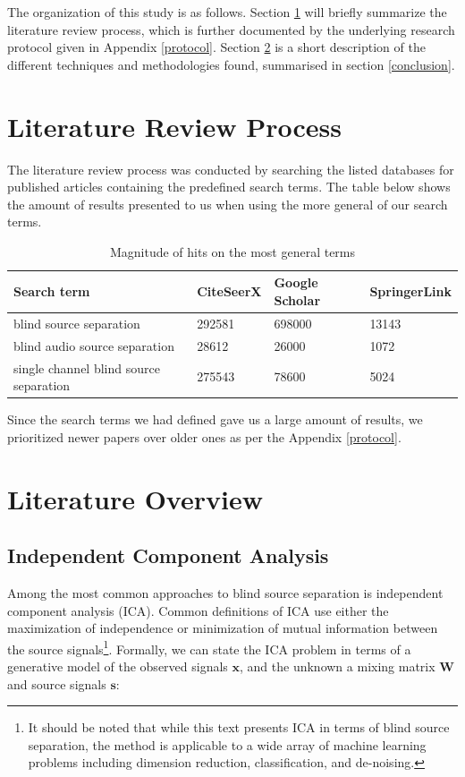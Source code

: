 The organization of this study is as follows. Section
\ref{reviewProcess} will briefly summarize the literature review
process, which is further documented by the underlying research
protocol given in Appendix \ref{protocol}. Section \ref{overview} is
a short description of the different techniques and methodologies found, summarised in section \ref{conclusion}.

\section{Literature Review Process}\label{reviewProcess} %
The literature review process was conducted by searching the listed databases for published articles containing the predefined search terms.
The table below shows the amount of results presented to us when  using the more general of our search terms.

\begin{table}[h]
\centering
	\begin{tabular}{|l|l|l|l|}
	\hline
	\textbf{Search term} & \textbf{CiteSeerX} & \textbf{Google Scholar} & \textbf{SpringerLink} \\
	\hline
	blind source separation & 292581 & 698000 & 13143\\
	blind audio source separation & 28612 & 26000 & 1072\\
	single channel blind source separation & 275543 & 78600 & 5024\\
	\hline
	\end{tabular}
\caption{Magnitude of hits on the most general terms}
\label{tab:myfirsttable}
\end{table}

Since the search terms we had defined gave us a large amount of results, we prioritized newer papers over older ones as per the Appendix \ref{protocol}. 

\section{Literature Overview}\label{overview}



\subsection{Independent Component Analysis} %

Among the most common approaches to blind source separation is
independent component analysis (ICA). Common definitions of ICA use
either the maximization of independence or minimization of mutual information between the source
signals\footnote{It should be noted that while this text presents ICA
  in terms of blind source separation, the method is applicable to a
  wide array of machine learning problems including dimension
  reduction, classification, and de-noising.}. Formally, we can state
the ICA problem in terms of a generative model of the observed signals
$\mathbf{x}$, and the unknown a mixing matrix $\mathbf{W}$ and source
signals $\mathbf{s}$:


